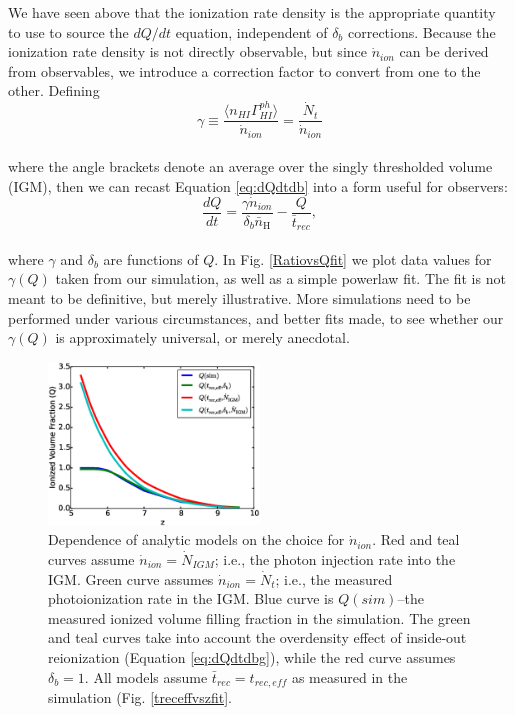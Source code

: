We have seen above that the ionization rate density is the appropriate quantity to use to source the $dQ/dt$ equation, independent of $\delta_b$ corrections. Because the ionization rate density is not directly observable, but since $\dot{n}_{ion}$ can be derived from observables, we introduce a correction factor to convert from one to the other. Defining 
\begin{equation}
\gamma \equiv \frac{\langle n_{HI}\Gamma_{HI}^{ph}\rangle}{\dot{n}_{ion}} = \frac{\dot{N}_t}{\dot{n}_{ion}}
\label{gamma}
\end{equation}
\\where the angle brackets denote an average over the singly thresholded volume (IGM), then we can recast Equation \eqref{eq:dQdtdb} into a form useful for observers:
\begin{equation}
	\frac{dQ}{dt} = \frac{\gamma\dot{n}_{ion}}{\delta_b\bar{n}_\mathrm{H}}-\frac{Q}{\bar{t}_{rec}}, 
	\label{eq:dQdtdbg}
\end{equation}
\\where $\gamma$ and $\delta_b$ are functions of $Q$. 
In Fig. \ref{RatiovsQfit} we plot data values for $\gamma(Q)$ taken from our simulation, as well as a simple powerlaw fit. The fit is not meant to be definitive, but merely illustrative. More simulations need to be performed under various circumstances, and better fits made, to see whether our $\gamma(Q)$ is approximately universal, or merely anecdotal. 

\begin{figure}
	\includegraphics[width=0.5\textwidth]{Qeffv3.eps}
	\caption{Dependence of analytic models on the choice for $\dot{n}_{ion}$. Red and teal curves assume $\dot{n}_{ion}=\dot{N}_{IGM}$; i.e., the photon injection rate into the IGM. Green curve assumes $\dot{n}_{ion}=\dot{N}_{t}$; i.e., the measured photoionization rate in the IGM. Blue curve is $Q(sim)$--the measured ionized volume filling fraction in the simulation. The green and teal curves take into account the overdensity effect of inside-out reionization (Equation \eqref{eq:dQdtdbg}), while the red curve assumes $\delta_b=1$. All models assume $\bar{t}_{rec}=t_{rec,eff}$ as measured in the simulation (Fig. \ref{treceffvszfit}.}
	\label{Qeffv3}
\end{figure}

